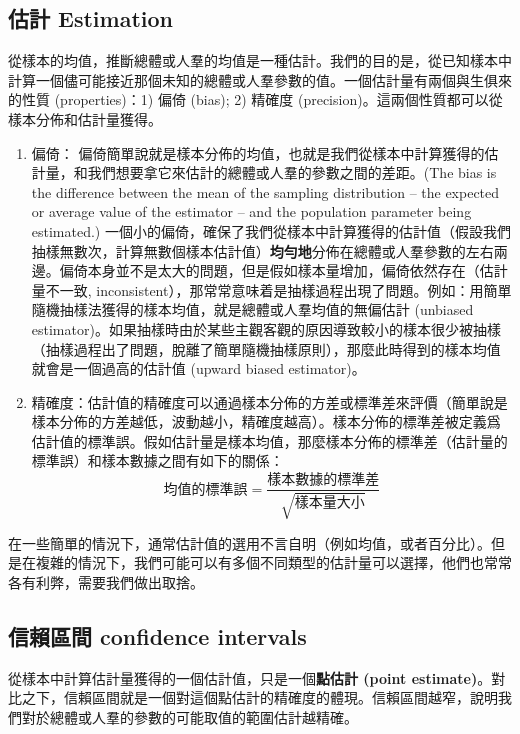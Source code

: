 \documentclass[]{ctexbook}
\begin{document}
\subsection{估計 Estimation}\label{-estimation}

從樣本的均值，推斷總體或人羣的均值是一種估計。我們的目的是，從已知樣本中計算一個儘可能接近那個未知的總體或人羣參數的值。一個估計量有兩個與生俱來的性質
(properties)：1) 偏倚 (bias); 2) 精確度
(precision)。這兩個性質都可以從樣本分佈和估計量獲得。

\begin{enumerate}
\def\labelenumi{\arabic{enumi}.}
\item
  偏倚：
  偏倚簡單說就是樣本分佈的均值，也就是我們從樣本中計算獲得的估計量，和我們想要拿它來估計的總體或人羣的參數之間的差距。(The
  bias is the difference between the mean of the sampling distribution
  -- the expected or average value of the estimator -- and the
  population parameter being estimated.)
  一個小的偏倚，確保了我們從樣本中計算獲得的估計值（假設我們抽樣無數次，計算無數個樣本估計值）\textbf{均勻地}分佈在總體或人羣參數的左右兩邊。偏倚本身並不是太大的問題，但是假如樣本量增加，偏倚依然存在（估計量不一致,
  inconsistent），那常常意味着是抽樣過程出現了問題。例如：用簡單隨機抽樣法獲得的樣本均值，就是總體或人羣均值的無偏估計
  (unbiased
  estimator)。如果抽樣時由於某些主觀客觀的原因導致較小的樣本很少被抽樣（抽樣過程出了問題，脫離了簡單隨機抽樣原則），那麼此時得到的樣本均值就會是一個過高的估計值
  (upward biased estimator)。
\item
  精確度：估計值的精確度可以通過樣本分佈的方差或標準差來評價（簡單說是樣本分佈的方差越低，波動越小，精確度越高）。樣本分佈的標準差被定義爲估計值的標準誤。假如估計量是樣本均值，那麼樣本分佈的標準差（估計量的標準誤）和樣本數據之間有如下的關係：
  \[均值的標準誤 = \frac{樣本數據的標準差}{\sqrt{樣本量大小}}\]
\end{enumerate}

在一些簡單的情況下，通常估計值的選用不言自明（例如均值，或者百分比）。但是在複雜的情況下，我們可能可以有多個不同類型的估計量可以選擇，他們也常常各有利弊，需要我們做出取捨。

\subsection{信賴區間 confidence intervals}\label{-confidence-intervals}

從樣本中計算估計量獲得的一個估計值，只是一個\textbf{點估計 (point
estimate)}。對比之下，信賴區間就是一個對這個點估計的精確度的體現。信賴區間越窄，說明我們對於總體或人羣的參數的可能取值的範圍估計越精確。
\end{document}
